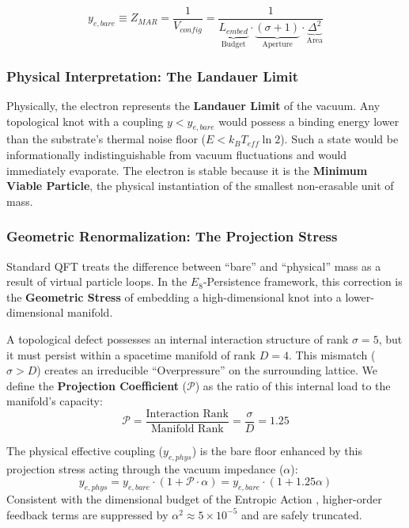 \begin{equation}
y_{e,bare} \equiv Z_{MAR} = \frac{1}{V_{config}} = \frac{1}{\underbrace{L_{embed}}_{\text{Budget}} \cdot \underbrace{(\sigma+1)}_{\text{Aperture}} \cdot \underbrace{\Delta^2}_{\text{Area}}}
\end{equation}

\subsubsection{Physical Interpretation: The Landauer Limit}
Physically, the electron represents the \textbf{Landauer Limit} of the vacuum. Any topological knot with a coupling $y < y_{e,bare}$ would possess a binding energy lower than the substrate's thermal noise floor ($E < k_B T_{eff} \ln 2$). Such a state would be informationally indistinguishable from vacuum fluctuations and would immediately evaporate. The electron is stable because it is the \textbf{Minimum Viable Particle}, the physical instantiation of the smallest non-erasable unit of mass.

\subsubsection{Geometric Renormalization: The Projection Stress}
Standard QFT treats the difference between ``bare'' and ``physical'' mass as a result of virtual particle loops. In the $E_8$-Persistence framework, this correction is the \textbf{Geometric Stress} of embedding a high-dimensional knot into a lower-dimensional manifold.

A topological defect possesses an internal interaction structure of rank $\sigma=5$, but it must persist within a spacetime manifold of rank $D=4$. This mismatch ($\sigma > D$) creates an irreducible ``Overpressure'' on the surrounding lattice. We define the \textbf{Projection Coefficient} ($\mathcal{P}$) as the ratio of this internal load to the manifold's capacity:
\begin{equation}
\mathcal{P} = \frac{\text{Interaction Rank}}{\text{Manifold Rank}} = \frac{\sigma}{D} = 1.25
\end{equation}

The physical effective coupling ($y_{e,phys}$) is the bare floor enhanced by this projection stress acting through the vacuum impedance ($\alpha$):
\begin{equation}
y_{e,phys} = y_{e,bare} \cdot \left(1 + \mathcal{P} \cdot \alpha \right) = y_{e,bare} \cdot \left(1 + 1.25\alpha \right)
\end{equation}
Consistent with the dimensional budget of the Entropic Action \cite{meyer_ieaction_2026}, higher-order feedback terms are suppressed by $\alpha^2 \approx 5 \times 10^{-5}$ and are safely truncated.

